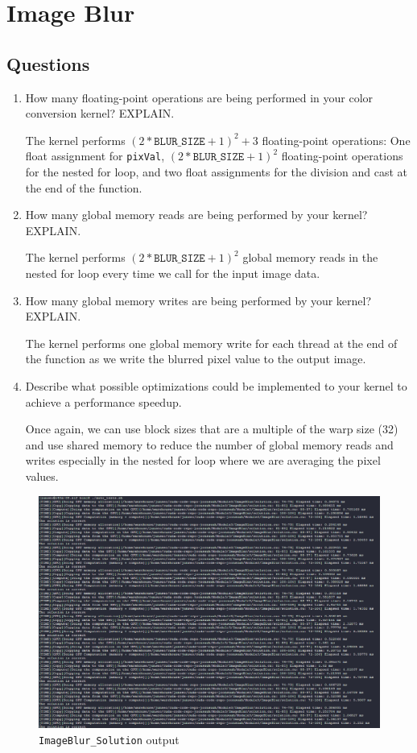 \documentclass[../main.tex]{subfiles}
\begin{document}
\pagestyle{fancy}


\renewcommand{\thefigure}{\arabic{figure}}
\section*{Image Blur}

\subsection*{Questions}

\begin{enumerate}
    \item How many floating-point operations are being performed in your color
    conversion kernel? EXPLAIN.

    The kernel performs $(2 * \texttt{BLUR\_SIZE} + 1)^2 + 3$ floating-point operations:
    One float assignment for \texttt{pixVal},
    $(2 * \texttt{BLUR\_SIZE} + 1)^2$ floating-point operations for the nested for loop,
    and two float assignments for the division and cast at the end of the function.

    \item How many global memory reads are being performed by your kernel?
    EXPLAIN.

    The kernel performs $(2 * \texttt{BLUR\_SIZE} + 1)^2$ global memory reads in the
    nested for loop every time we call for the input image data.

    \item How many global memory writes are being performed by your kernel?
    EXPLAIN.

    The kernel performs one global memory write for each thread at the end of the function as
    we write the blurred pixel value to the output image.

    \item Describe what possible optimizations could be implemented to your kernel
    to achieve a performance speedup.

    Once again, we can use block sizes that are a multiple of the warp size (32) and use
    shared memory to reduce the number of global memory reads and writes especially in the
    nested for loop where we are averaging the pixel values.
\end{enumerate}


\begin{figure}
    [ht]
    \centering
    \includegraphics[width=1\textwidth]{imageblur.png}
    \caption{\texttt{ImageBlur\_Solution} output}
\end{figure}
\end{document}
